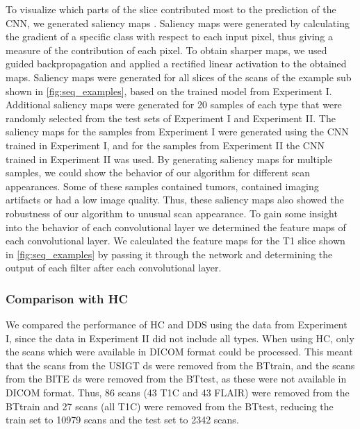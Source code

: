 To visualize which parts of the \gls{slice} contributed most to the prediction of the \gls{CNN}, we generated saliency maps \autocite{simonyan2014deep}.
Saliency maps were generated by calculating the gradient of a specific \gls{class} with respect to each input pixel, thus giving a measure of the contribution of each pixel.
To obtain sharper maps, we used guided backpropagation \autocite{springenberg2015striving} and applied a rectified linear activation to the obtained maps.
Saliency maps were generated for all \glspl{slice} of the \glspl{scan} of the example \gls{sub} shown in \cref{fig:seq_examples}, based on the trained model from Experiment I.
Additional saliency maps were generated for 20 \glspl{sample} of each \gls{type} that were randomly selected from the test sets of Experiment I and Experiment II.
The saliency maps for the \glspl{sample} from Experiment I were generated using the \gls{CNN} trained in Experiment I, and for the \glspl{sample} from Experiment II the \gls{CNN} trained in Experiment II was used.
By generating saliency maps for multiple \glspl{sample}, we could show the behavior of our algorithm for different \gls{scan} appearances.
Some of these \glspl{sample} contained tumors, contained imaging artifacts or had a low image quality.
Thus, these saliency maps also showed the robustness of our algorithm to unusual \gls{scan} appearance.
To gain some insight into the behavior of each convolutional layer we determined the feature maps of each convolutional layer.
We calculated the feature maps for the \gls{T1} \gls{slice} shown in \cref{fig:seq_examples} by passing it through the network and determining the output of each filter after each convolutional layer.


\subsubsection{Comparison with \gls{HC}}

We compared the performance of \gls{HC} and \gls{DDS} using the data from Experiment I, since the data in Experiment II did not include all \glspl{type}.
When using \gls{HC}, only the \glspl{scan} which were available in \gls{DICOM} format could be processed.
This meant that the \glspl{scan} from the \gls{USIGT} \gls{ds} were removed from the \gls{BTtrain}, and the \glspl{scan} from the \gls{BITE} \gls{ds} were removed from the \gls{BTtest}, as these were not available in \gls{DICOM} format.
Thus,  86 \glspl{scan} (43 \gls{T1C} and 43 \gls{FLAIR}) were removed from the \gls{BTtrain} and 27 \glspl{scan} (all \gls{T1C}) were removed from the \gls{BTtest}, reducing the train set to 10979 \glspl{scan} and the test set to 2342 \glspl{scan}.

